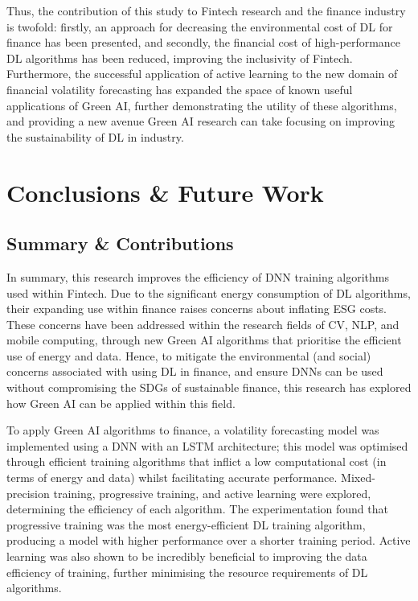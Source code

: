\documentclass[a4paper, 11pt]{report}
\begin{document}
    Thus, the contribution of this study to Fintech research and the finance industry is twofold: firstly, an approach for decreasing the environmental cost of DL for finance has been presented, and secondly, the financial cost of high-performance DL algorithms has been reduced, improving the inclusivity of Fintech. Furthermore, the successful application of active learning to the new domain of financial volatility forecasting has expanded the space of known useful applications of Green AI, further demonstrating the utility of these algorithms, and providing a new avenue Green AI research can take focusing on improving the sustainability of DL in industry.


    \newpage
    \chapter{Conclusions \& Future Work}
    \label{chapter: conclusion}

    \section{Summary \& Contributions}

    In summary, this research improves the efficiency of DNN training algorithms used within Fintech. Due to the significant energy consumption of DL algorithms, their expanding use within finance raises concerns about inflating ESG costs. These concerns have been addressed within the research fields of CV, NLP, and mobile computing, through new Green AI algorithms that prioritise the efficient use of energy and data. Hence, to mitigate the environmental (and social) concerns associated with using DL in finance, and ensure DNNs can be used without compromising the SDGs of sustainable finance, this research has explored how Green AI can be applied within this field.

    To apply Green AI algorithms to finance, a volatility forecasting model was implemented using a DNN with an LSTM architecture; this model was optimised through efficient training algorithms that inflict a low computational cost (in terms of energy and data) whilst facilitating accurate performance. Mixed-precision training, progressive training, and active learning were explored, determining the efficiency of each algorithm. The experimentation found that progressive training was the most energy-efficient DL training algorithm, producing a model with higher performance over a shorter training period. Active learning was also shown to be incredibly beneficial to improving the data efficiency of training, further minimising the resource requirements of DL algorithms.
\end{document}
